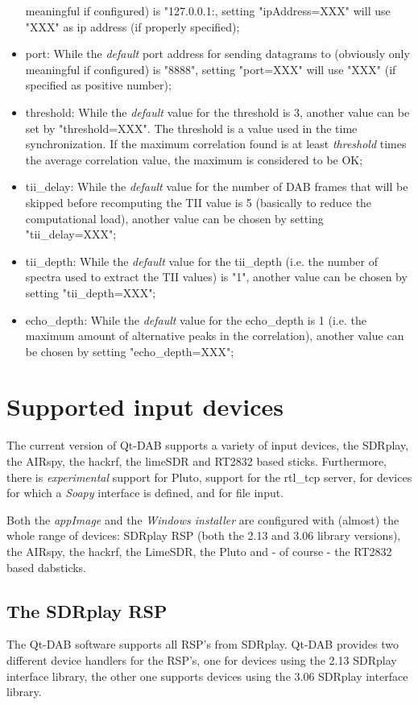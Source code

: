 \documentclass[12pt]{article}
\begin{document}
\begin{itemize}
meaningful if configured) is "127.0.0.1:, setting
"ipAddress=XXX" will use "XXX" as
ip address (if properly specified);
\item port:
While the {\em default} port address for sending datagrams to (obviously only
meaningful if configured) is "8888", setting
"port=XXX" will use "XXX" (if specified as positive number);
\item threshold:
While the {\em default} value for the threshold is 3, another value
can be set by "threshold=XXX". The threshold is a value used in the
time synchronization. If the maximum correlation found is at least
{\em threshold} times the average correlation value,
the maximum is considered to be OK;
\item tii\_delay:
While the {\em default} value for the number of DAB frames that will be 
skipped before recomputing the TII value is 5 (basically to reduce
the computational load), another value can be chosen by setting
"tii\_delay=XXX";
\item tii\_depth:
While the {\em default} value for the tii\_depth (i.e. the number of
spectra used to extract the TII values) is "1", another value can
be chosen by setting "tii\_depth=XXX";
\item echo\_depth:
While the {\em default} value for the echo\_depth is 1 (i.e. the maximum
amount of alternative peaks in the correlation), another value can be
chosen by setting "echo\_depth=XXX";
\end{itemize}

\section{Supported input devices}
The current version of Qt-DAB supports a variety of input devices,
the SDRplay, the AIRspy, the hackrf, the limeSDR and RT2832 based
sticks. Furthermore, there is {\em experimental} support for Pluto,
support for  the rtl\_tcp server, for devices for which a {\em Soapy}
interface is defined, and for file input.
\par
Both the {\em appImage} and the {\em Windows installer} are
configured with (almost) the whole range of devices: SDRplay RSP (both 
the 2.13 and 3.06 library versions),
the AIRspy, the hackrf, the LimeSDR, the Pluto and - of course - the RT2832 based
dabsticks. 
\par
\subsection{The SDRplay RSP}
The Qt-DAB software supports all RSP's from SDRplay.
Qt-DAB provides two different device handlers for the RSP's, one
for devices using the 2.13 SDRplay interface library,
the other one supports devices using the 3.06 SDRplay interface library.
\end{document}
